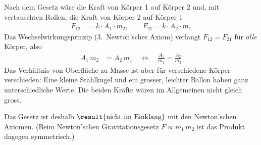 Nach dem Gesetz wäre die Kraft von Körper 1 auf Körper 2 und, mit vertauschten Rollen, die Kraft von Körper 2 auf Körper 1
\begin{align}
 F_{12} &= k\cdot A_1\cdot m_2, \qquad F_{21} = k\cdot A_2\cdot m_1
\end{align}
Das Wechselwirkungsprinzip (3.~Newton'sches Axiom) verlangt $F_{12} = F_{21}$ für \emph{alle} Körper, also
\begin{align}
 A_1\,m_2 &= A_2\,m_1 \quad\Leftrightarrow\quad \frac{A_1}{m_1} = \frac{A_2}{m_2}
\end{align}
Das Verhältnis von Oberfläche zu Masse ist aber für verschiedene Körper verschieden: Eine kleine Stahlkugel und ein grosser, leichter Ballon haben ganz unterschiedliche Werte. Die beiden Kräfte wären im Allgemeinen nicht gleich gross.

Das Gesetz ist deshalb $\result{\text{nicht im Einklang}}$ mit den Newton'schen Axiomen. (Beim Newton'schen Gravitationsgesetz $F \propto m_1\,m_2$ ist das Produkt dagegen symmetrisch.)
